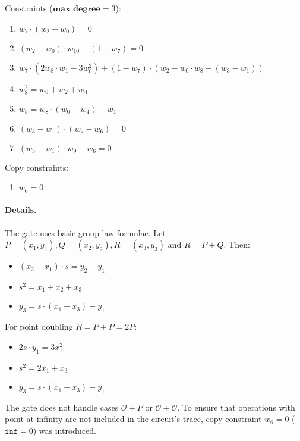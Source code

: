 Constraints ($\textbf{max degree} = 3$):
\begin{enumerate}
	 \item $w_7 \cdot (w_2 - w_0) = 0$
    \item $(w_2 - w_0) \cdot w_{10} - (1 - w_7) = 0$
    \item $w_7 \cdot (2w_8 \cdot w_1 - 3w_0^2) + (1 - w_7) \cdot (w_2 - w_0 \cdot w_8 - (w_3 - w_1))$
    \item $w_8^2 = w_0 + w_2 + w_4$
    \item $w_5 = w_8 \cdot (w_0 - w_4) - w_1$
    \item $(w_3 - w_1) \cdot (w_7 - w_6) = 0$
    \item $(w_3 - w_1) \cdot w_9 - w_6 = 0$
\end{enumerate}

Copy constraints:
\begin{enumerate}
	\item $w_6 = 0$
\end{enumerate}

\paragraph{Details.}

The gate uses basic group law formulae. 
Let $P = (x_1, y_1), Q = (x_2, y_2), R = (x_3, y_3)$ and $R = P + Q$. Then: 
\begin{itemize}
    \item $(x_2 - x_1) \cdot s = y_2 - y_1$
    \item $s^2 = x_1 + x_2 + x_3$
    \item $y_3 = s \cdot (x_1 - x_3) - y_1$
\end{itemize}
For point doubling $R = P + P = 2P$:
\begin{itemize}
    \item $2s \cdot y_1 = 3x_1^2$
    \item $s^2 = 2x_1 + x_3$
    \item $y_3 = s \cdot (x_1 - x_3) - y_1$
\end{itemize}

The gate does not handle cases $\mathcal{O} + P$ or $\mathcal{O} + \mathcal{O}$.
To ensure that operations with point-at-infinity are not included in the circuit's trace, copy constraint $w_6 = 0$ ($\texttt{inf} = 0$) was introduced. 

